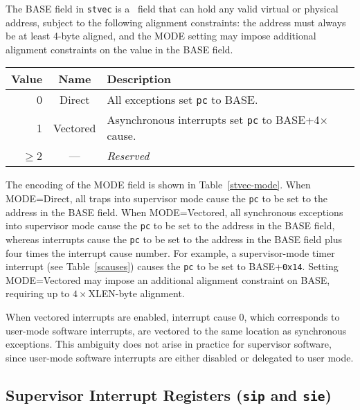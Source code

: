 The BASE field in {\tt stvec} is a \warl\ field that can hold any valid virtual
or physical address, subject to the following alignment constraints: the
address must always be at least 4-byte aligned, and the MODE
setting may impose additional alignment constraints on the value in the BASE
field.

\begin{table*}[h!]
\begin{center}
\begin{tabular}{|r|c|l|}
\hline
Value & Name & Description \\
\hline	 
0      & Direct   & All exceptions set {\tt pc} to BASE. \\
1      & Vectored & Asynchronous interrupts set {\tt pc} to BASE+4$\times$cause. \\
$\ge$2 & --- & {\em Reserved} \\
\hline
\end{tabular}
\end{center}
\caption{Encoding of {\tt stvec} MODE field.}
\label{stvec-mode}
\end{table*}

The encoding of the MODE field is shown in Table~\ref{stvec-mode}.  When
MODE=Direct, all traps into supervisor mode cause the {\tt pc} to be set to the
address in the BASE field.  When MODE=Vectored, all synchronous exceptions
into supervisor mode cause the {\tt pc} to be set to the address in the BASE
field, whereas interrupts cause the {\tt pc} to be set to the address in
the BASE field plus four times the interrupt cause number.  For example,
a supervisor-mode timer interrupt (see Table~\ref{scauses}) causes the {\tt pc}
to be set to BASE+{\tt 0x14}.
Setting MODE=Vectored may impose an additional alignment constraint on BASE,
requiring up to $4\times$XLEN-byte alignment.

\begin{commentary}
When vectored interrupts are enabled, interrupt cause 0, which corresponds to
user-mode software interrupts, are vectored to the same location as
synchronous exceptions.  This ambiguity does not arise in practice for
supervisor software, since user-mode software interrupts are either disabled
or delegated to user mode.
\end{commentary}

\subsection{Supervisor Interrupt Registers ({\tt sip} and {\tt sie})}

